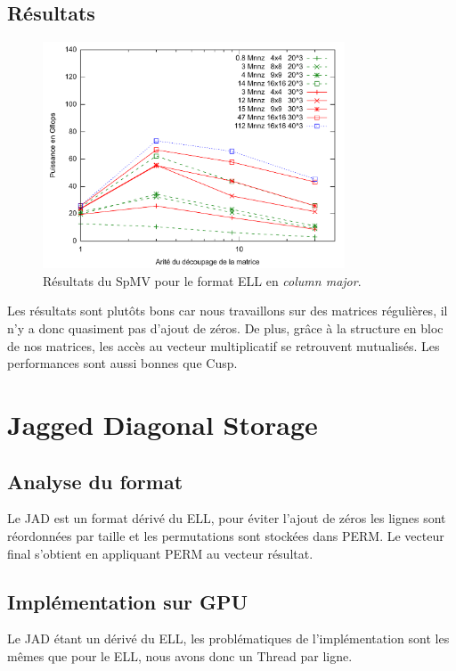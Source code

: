 \documentclass[a4paper,11pt]{report}
\begin{document}

  \subsection{Résultats}
   \begin{figure}[h!]\begin{center}
     \includegraphics[width=0.8\textwidth]{resultats/ELL.pdf}
     \caption{Résultats du SpMV pour le format ELL en \textit{column major}.}
     \label{res_ell}
   \end{center}\end{figure}
   
   Les résultats sont plutôts bons car nous travaillons sur des matrices
   régulières, il n'y a donc quasiment pas d'ajout de zéros. De plus, grâce
   à la structure en bloc de nos matrices, les accès au vecteur
   multiplicatif se retrouvent mutualisés. Les performances sont aussi
   bonnes que Cusp.

 \section[JAD : JAgged Diagonale storage]{Jagged Diagonal Storage}
  \subsection{Analyse du format}
   
   Le JAD est un format dérivé du ELL, pour éviter l'ajout de
   zéros les lignes sont réordonnées par taille et les permutations
   sont stockées dans PERM. Le vecteur final s'obtient en appliquant
   PERM au vecteur résultat.

  \subsection{Implémentation sur GPU}
   Le JAD étant un dérivé du ELL, les problématiques de l'implémentation
   sont les mêmes que pour le ELL, nous avons donc un Thread par ligne.
   
\end{document}
